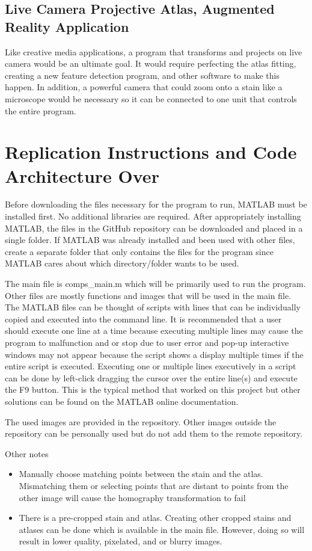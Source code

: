 \documentclass[10pt,twocolumn]{article}
\begin{document}
\subsection{Live Camera Projective Atlas, Augmented Reality Application}
Like creative media applications, a program that transforms and projects on live camera would be an ultimate goal. It would require perfecting the atlas fitting, creating a new feature detection program, and other software to make this happen. In addition, a powerful camera that could zoom onto a stain like a microscope would be necessary so it can be connected to one unit that controls the entire program. 

\section{Replication Instructions and Code Architecture Over}
Before downloading the files necessary for the program to run, MATLAB must be installed first. No additional libraries are required. After appropriately installing MATLAB, the files in the GitHub repository can be downloaded and placed in a single folder. If MATLAB was already installed and been used with other files, create a separate folder that only contains the files for the program since MATLAB cares about which directory/folder wants to be used. 

The main file is comps\_main.m which will be primarily used to run the program. Other files are mostly functions and images that will be used in the main file. The MATLAB files can be thought of scripts with lines that can be individually copied and executed into the command line. It is recommended that a user should execute one line at a time because executing multiple lines may cause the program to malfunction and or stop due to user error and pop-up interactive windows may not appear because the script shows a display multiple times if the entire script is executed. Executing one or multiple lines executively in a script can be done by left-click dragging the cursor over the entire line(s) and execute the F9 button. This is the typical method that worked on this project but other solutions can be found on the MATLAB online documentation. 

The used images are provided in the repository. Other images outside the repository can be personally used but do not add them to the remote repository. 

Other notes
\begin{itemize}
\item Manually choose matching points between the stain and the atlas. Mismatching them or selecting points that are distant to points from the other image will cause the homography transformation to fail
\item There is a pre-cropped stain and atlas. Creating other cropped stains and atlases can be done which is available in the main file. However, doing so will result in lower quality, pixelated, and or blurry images.
\end{itemize}
\end{document}
